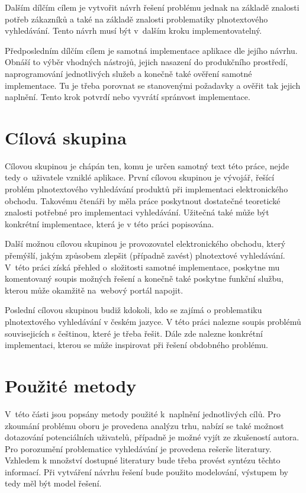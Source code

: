 \documentclass[FM,DP]{tulthesis}
\begin{document}
Dalším dílčím cílem je vytvořit návrh řešení problému jednak na základě znalosti potřeb
zákazníků a také na základě znalosti problematiky plnotextového vyhledávání. Tento návrh musí 
být v~dalším kroku implementovatelný.

Předposledním dílčím cílem je samotná implementace aplikace dle jejího návrhu. Obnáší to výběr 
vhodných nástrojů, jejich nasazení do produkčního prostředí, naprogramování jednotlivých
služeb a konečně také ověření samotné implementace. Tu je třeba porovnat se stanovenými požadavky
a ověřit tak jejich naplnění. Tento krok potvrdí nebo vyvrátí spránvost implementace.

\section{Cílová skupina}

Cílovou skupinou je chápán ten, komu je určen samotný text této práce, nejde tedy
o~uživatele vzniklé aplikace. 
První cílovou skupinou je vývojář, řešící problém plnotextového vyhledávání produktů 
při implementaci elektronického obchodu. Takovému čtenáři by měla práce poskytnout dostatečné
teoretické znalosti potřebné pro implementaci vyhledávání. Užitečná také může být konkrétní
implementace, která je v této práci popisována.

Další možnou cílovou skupinou je provozovatel elektronického obchodu, který přemýšlí, 
jakým způsobem zlepšit (případně zavést) plnotextové vyhledávání. V~této práci získá 
přehled o~složitosti samotné implementace, poskytne mu komentovaný soupis možných řešení 
a konečně také poskytne funkční službu, kterou může okamžitě na~webový portál napojit.

Poslední cílovou skupinou budiž kdokoli, kdo se zajímá o problematiku plnotextového 
vyhledávání v českém jazyce. V této práci nalezne soupis problémů souvisejicích s češtinou, 
které je třeba řešit. Dále zde nalezne konkrétní implementaci, kterou se může inspirovat 
při řešení obdobného problému.

\section{Použité metody}

V~této části jsou popsány metody použité k~naplnění jednotlivých cílů. Pro zkoumání problému
oboru je provedena analýzu trhu, nabízí se také možnost dotazování potenciálních uživatelů, 
případně je možné vyjít ze zkušeností autora. Pro porozumění problematice vyhledávání 
je provedena rešerše literatury. Vzhledem k množství dostupné literatury bude třeba provést 
syntézu těchto informací. Při vytváření návrhu řešení bude použito modelování, výstupem 
by tedy měl být model řešení. 
\end{document}
